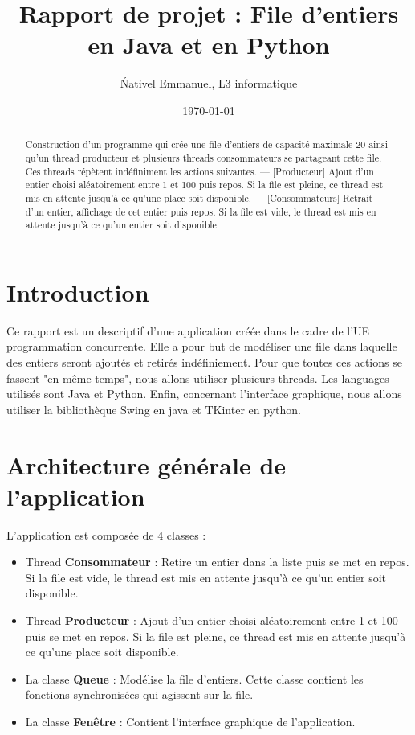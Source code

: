 \documentclass{article}
\title{Rapport de projet : File d'entiers en Java et en Python}
\author{\'Nativel Emmanuel, L3 informatique}
\date{\today}
\begin{document}
\maketitle %


\begin{abstract}
  Construction d'un programme qui crée une file d’entiers de capacité maximale 20 ainsi qu’un thread producteur et plusieurs threads consommateurs se partageant cette file. Ces threads répètent indéfiniment les actions suivantes.
  — [Producteur] Ajout d’un entier choisi aléatoirement entre 1 et 100 puis repos. Si la file est pleine, ce thread est mis en attente jusqu’à ce qu’une place soit disponible.
  — [Consommateurs] Retrait d’un entier, affichage de cet entier puis repos. Si la file est vide, le thread est mis en attente jusqu’à ce qu’un entier soit disponible.
\end{abstract}

\section{Introduction}
\label{section:introduction}

Ce rapport est un descriptif d'une application créée dans le cadre de l'UE programmation concurrente. Elle a pour but de modéliser une file dans laquelle des entiers seront ajoutés et retirés indéfiniement. Pour que toutes ces actions se fassent "en même temps", nous allons utiliser plusieurs threads. Les languages utilisés sont Java et Python. Enfin, concernant l'interface graphique, nous allons utiliser la bibliothèque Swing\cite{swingDoc} en java et TKinter\cite{tkinterDoc} en python.

\section{Architecture générale de l'application}
\label{section:architecture}

L'application est composée de 4 classes :
\begin{itemize}
\item Thread \textbf{Consommateur} : Retire un entier dans la liste puis se met en repos. Si la file est vide, le thread est mis en attente jusqu’à ce qu’un entier soit disponible.
\item Thread \textbf{Producteur} : Ajout d’un entier choisi aléatoirement entre 1 et 100 puis se met en repos. Si la file
est pleine, ce thread est mis en attente jusqu’à ce qu’une place soit disponible.
\item La classe \textbf{Queue} : Modélise la file d'entiers. Cette classe contient les fonctions synchronisées qui agissent sur la file.
\item La classe \textbf{Fenêtre} : Contient l'interface graphique de l'application.
\end{itemize}
\end{document}
